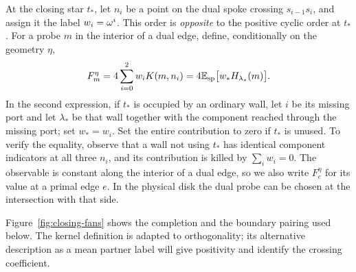 At the closing star $t_*$, let $n_i$ be a point on the dual spoke crossing
$s_{i-1}s_i$, and assign it the label $w_i=\omega^i$. This order is
\emph{opposite} to the positive cyclic order at $t_*$. For a probe $m$ in
the interior of a dual edge, define, conditionally on the geometry $\eta$,
\begin{equation}
 F_m^\eta=4\sum_{i=0}^2w_iK(m,n_i)
          =4\mathbb E_{\mathrm{sp}}\bigl[w_*H_{\lambda_*}(m)\bigr].
 \label{observable:definition}
\end{equation}
In the second expression, if $t_*$ is occupied by an ordinary wall, let
$i$ be its missing port and let $\lambda_*$ be that wall together with
the component reached through the missing port; set $w_*=w_i$. Set the
entire contribution to zero if $t_*$ is unused. To verify the equality,
observe that a wall not using $t_*$ has identical component indicators at
all three $n_i$, and its contribution is killed by $\sum_iw_i=0$.
The observable is constant along the interior of a dual edge, so we also
write $F_e^\eta$ for its value at a primal edge $e$. In the physical disk
the dual probe can be chosen at the intersection with that side.

Figure~\ref{fig:closing-fans} shows the completion and the boundary
pairing used below. The kernel definition is adapted to orthogonality;
its alternative description as a mean partner label will give positivity
and identify the crossing coefficient.


